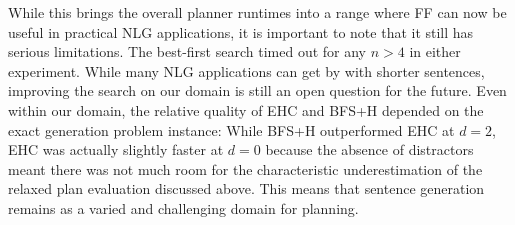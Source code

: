 While this brings the overall planner runtimes into a range where FF
can now be useful in practical NLG applications, it is important to
note that it still has serious limitations.  The best-first search
timed out for any $n>4$ in either experiment.  While many NLG
applications can get by with shorter sentences, improving the search
on our domain is still an open question for the future.  Even within
our domain, the relative quality of EHC and BFS+H depended on the
exact generation problem instance: While BFS+H outperformed EHC at
$d=2$, EHC was actually slightly faster at $d=0$ because the absence
of distractors meant there was not much room for the characteristic
underestimation of the relaxed plan evaluation discussed above.  This
means that sentence generation remains as a varied and challenging
domain for planning.



